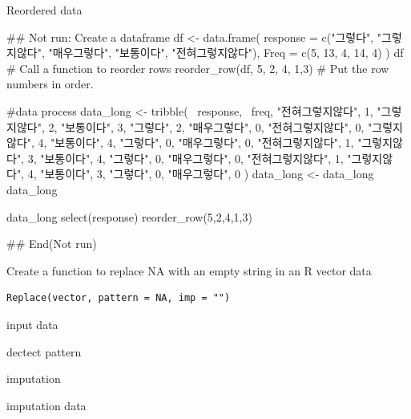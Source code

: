 \documentclass[a4paper]{book}
\begin{document}
%
\begin{Value}
Reordered data
\end{Value}
%
\begin{Examples}
\begin{ExampleCode}
## Not run: 
Create a dataframe
df <- data.frame(
  response = c("그렇다", "그렇지않다", "매우그렇다", "보통이다", "전혀그렇지않다"),
  Freq = c(5, 13, 4, 14, 4)
)
df
# Call a function to reorder rows
reorder_row(df, 5, 2, 4, 1,3)  # Put the row numbers in order.

#data process
data_long <- tribble(
  ~response, ~freq,
  "전혀그렇지않다", 1,
  "그렇지않다", 2,
  "보통이다", 3,
  "그렇다", 2,
  "매우그렇다", 0,
  "전혀그렇지않다", 0,
  "그렇지않다", 4,
  "보통이다", 4,
  "그렇다", 0,
  "매우그렇다", 0,
  "전혀그렇지않다", 1,
  "그렇지않다", 3,
  "보통이다", 4,
  "그렇다", 0,
  "매우그렇다", 0,
  "전혀그렇지않다", 1,
  "그렇지않다", 4,
  "보통이다", 3,
  "그렇다", 0,
  "매우그렇다", 0
)
data_long <- data_long %
data_long

data_long %
  select(response)%
  reorder_row(5,2,4,1,3)


## End(Not run)

\end{ExampleCode}
\end{Examples}
%
\begin{Description}
Create a function to replace NA with an empty string in an R vector data
\end{Description}
%
\begin{Usage}
\begin{verbatim}
Replace(vector, pattern = NA, imp = "")
\end{verbatim}
\end{Usage}
%
\begin{Arguments}
\begin{ldescription}
\item[\code{vector}] input data

\item[\code{pattern}] dectect pattern

\item[\code{imp}] imputation
\end{ldescription}
\end{Arguments}
%
\begin{Value}
imputation data
\end{Value}
\end{document}
